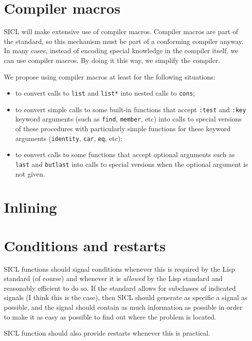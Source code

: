 \documentclass{article}
\def\sysname{SICL}
\begin{document}
\section{Compiler macros}

{\sysname} will make extensive use of compiler macros.  Compiler
macros are part of the standard, so this mechanism must be part of a
conforming compiler anyway.  In many cases, instead of encoding
special knowledge in the compiler itself, we can use compiler macros.
By doing it this way, we simplify the compiler.

We propose using compiler macros at least for the following
situations: 

\begin{itemize}
\item to convert calls to \texttt{list} and \texttt{list*} into nested
  calls to \texttt{cons};
\item to convert simple calls to some built-in functions that accept
  \texttt{:test} and \texttt{:key} keyword arguments (such as
  \texttt{find}, \texttt{member}, etc) into calls to
  special versions of these procedures with particularly simple
  functions for these keyword arguments (\texttt{identity},
  \texttt{car}, \texttt{eq}, etc);
\item to convert calls to some functions that accept optional
  arguments such as \texttt{last} and \texttt{butlast} into calls to
  special versions when the optional argument is not given.
\end{itemize}

\section{Inlining}

\section{Conditions and restarts}

\sysname{} functions should signal conditions whenever this is
required by the Lisp standard (of course) and whenever it is
\emph{allowed} by the Lisp standard and reasonably efficient to do
so.  If the standard allows for subclasses of indicated signals (I
think this is the case), then \sysname{} should generate as specific a
signal as possible, and the signal should contain as much information
as possible in order to make it as easy as possible to find out where
the problem is located. 

\sysname{} function should also provide restarts whenever this is
practical. 
\end{document}
